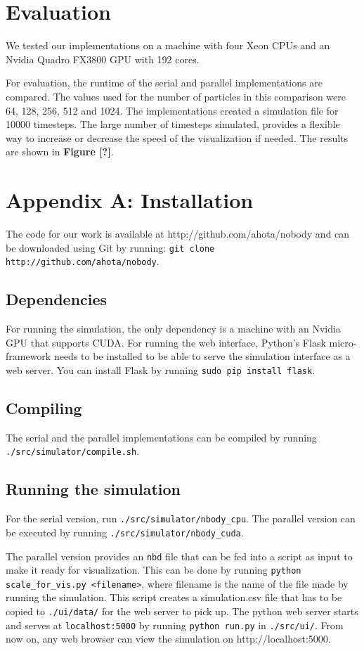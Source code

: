 \documentclass[10pt,a4paper]{article}
\begin{document}
	\section{Evaluation}
	We tested our implementations on a machine with four Xeon CPUs and an Nvidia Quadro FX3800 GPU with 192 cores. 
	
	For evaluation, the runtime of the serial and parallel implementations are compared. The values used for the number of particles in this comparison were 64, 128, 256, 512 and 1024. The implementations created a simulation file for 10000 timesteps. The large number of timesteps simulated, provides a flexible way to increase or decrease the speed of the visualization if needed. The results are shown in \textbf{Figure [?]}.
	
	\pagebreak
	
	\section{Appendix A: Installation}
		The code for our work is available at http://github.com/ahota/nobody and can be downloaded using Git by running: \texttt{git clone http://github.com/ahota/nobody}.
		
		\subsection{Dependencies}
		For running the simulation, the only dependency is a machine with an Nvidia GPU that supports CUDA. For running the web interface, Python's Flask micro-framework needs to be installed to be able to serve the simulation interface as a web server. You can install Flask by running \texttt{sudo pip install flask}. 
		
		\subsection{Compiling}
		The serial and the parallel implementations can be compiled by running \texttt{./src/simulator/compile.sh}. 
		
		\subsection{Running the simulation}
		For the serial version, run \texttt{./src/simulator/nbody\_cpu}.
		The parallel version can be executed by running \texttt{./src/simulator/nbody\_cuda}.
		
		The parallel version provides an \texttt{nbd} file that can be fed into a script as input to make it ready for visualization. This can be done by running \texttt{python scale\_for\_vis.py <filename>}, where filename is the name of the file made by running the simulation. This script creates a simulation.csv file that has to be copied to \texttt{./ui/data/} for the web server to pick up. The python web server starts and serves at \texttt{localhost:5000} by running \texttt{python run.py} in \texttt{./src/ui/}. From now on, any web browser can view the simulation on http://localhost:5000.
		
\end{document}
